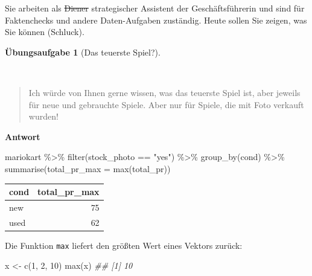 \documentclass[
  letterpaper,
]{scrbook}
\newenvironment{Shaded}{\begin{snugshade}}{\end{snugshade}}
\newcommand{\AttributeTok}[1]{\textcolor[rgb]{0.40,0.45,0.13}{#1}}
\newcommand{\DecValTok}[1]{\textcolor[rgb]{0.68,0.00,0.00}{#1}}
\newcommand{\DocumentationTok}[1]{\textcolor[rgb]{0.37,0.37,0.37}{\textit{#1}}}
\newcommand{\FunctionTok}[1]{\textcolor[rgb]{0.28,0.35,0.67}{#1}}
\newcommand{\NormalTok}[1]{\textcolor[rgb]{0.00,0.23,0.31}{#1}}
\newcommand{\OtherTok}[1]{\textcolor[rgb]{0.00,0.23,0.31}{#1}}
\newcommand{\SpecialCharTok}[1]{\textcolor[rgb]{0.37,0.37,0.37}{#1}}
\newcommand{\StringTok}[1]{\textcolor[rgb]{0.13,0.47,0.30}{#1}}
\theoremstyle{definition}
\newtheorem{exercise}{Übungsaufgabe}[chapter]
\theoremstyle{definition}
\theoremstyle{definition}
\theoremstyle{remark}
\begin{document}
Sie arbeiten als \st{Diener} strategischer Assistent der
Geschäftsführerin und sind für Faktenchecks und andere Daten-Aufgaben
zuständig. Heute sollen Sie zeigen, was Sie können (Schluck).

\begin{exercise}[Das teuerste
Spiel?]\protect\hypertarget{exr-fofrage1}{}\label{exr-fofrage1}

~

\begin{quote}
{} Ich würde von Ihnen gerne wissen, was das teuerste Spiel
ist, aber jeweils für neue und gebrauchte Spiele. Aber nur für Spiele,
die mit Foto verkauft wurden!
\end{quote}

\textbf{Antwort}

\begin{Shaded}
\begin{Highlighting}[]
\NormalTok{mariokart }\SpecialCharTok{\%\textgreater{}\%} 
  \FunctionTok{filter}\NormalTok{(stock\_photo }\SpecialCharTok{==} \StringTok{"yes"}\NormalTok{) }\SpecialCharTok{\%\textgreater{}\%} 
  \FunctionTok{group\_by}\NormalTok{(cond) }\SpecialCharTok{\%\textgreater{}\%} 
  \FunctionTok{summarise}\NormalTok{(}\AttributeTok{total\_pr\_max =} \FunctionTok{max}\NormalTok{(total\_pr))}
\end{Highlighting}
\end{Shaded}

\begin{longtable}[]{@{}lr@{}}
\toprule\noalign{}
cond & total\_pr\_max \\
\midrule\noalign{}
\endhead
\bottomrule\noalign{}
\endlastfoot
new & 75 \\
used & 62 \\
\end{longtable}

Die Funktion \texttt{max} liefert den größten Wert eines Vektors zurück:

\begin{Shaded}
\begin{Highlighting}[]
\NormalTok{x }\OtherTok{\textless{}{-}} \FunctionTok{c}\NormalTok{(}\DecValTok{1}\NormalTok{, }\DecValTok{2}\NormalTok{, }\DecValTok{10}\NormalTok{)}
\FunctionTok{max}\NormalTok{(x)}
\DocumentationTok{\#\# [1] 10}
\end{Highlighting}
\end{Shaded}

\end{exercise}
\end{document}
